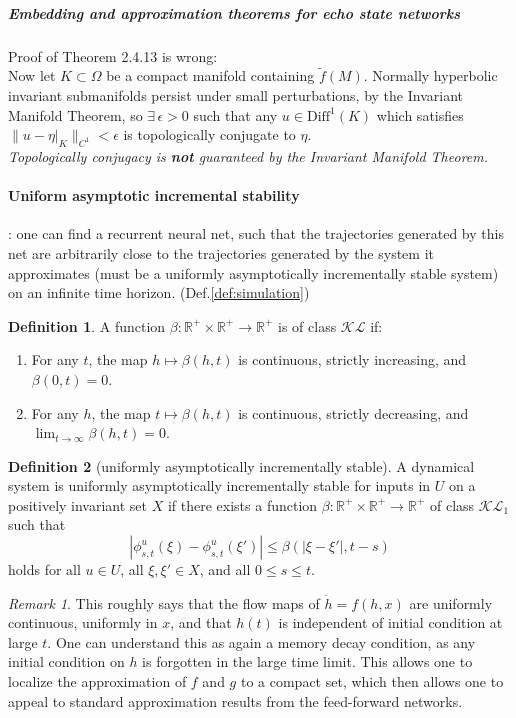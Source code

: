 \documentclass{article}
\theoremstyle{definition}
\newtheorem{definition}{Definition}
\theoremstyle{remark}
\newtheorem{remark}{Remark}
\begin{document}
\subparagraph{Embedding and approximation theorems for echo state networks}
\citep{hart2020embedding}
Proof of Theorem 2.4.13 is wrong: \\
Now let \( K \subset \Omega \) be a compact manifold containing \( \tilde{f}(M) \). Normally hyperbolic invariant submanifolds persist under small perturbations, by the Invariant Manifold Theorem, so \( \exists \, \epsilon > 0 \) such that any \( u \in \text{Diff}^1(K) \) which satisfies \( \| u - \eta|_K \|_{C^1} < \epsilon \) is topologically conjugate to \( \eta \).\\
\emph{Topologically conjugacy is \textbf{not} guaranteed by the Invariant Manifold Theorem.}




\paragraph{Uniform asymptotic incremental stability}%
\citep{hanson2020universal}: one can find a recurrent neural net, such that the trajectories generated by this net are arbitrarily close to the trajectories generated by the system it approximates (must be a uniformly asymptotically incrementally stable system) on an infinite time horizon.
(Def.\ref{def:simulation})

\citep{pavlov2006uniform}


\begin{definition}
A function \( \beta : \mathbb{R}^+ \times \mathbb{R}^+ \to \mathbb{R}^+ \) is of class \(\mathcal{KL}\) if:
\begin{enumerate}
    \item For any \( t \), the map \( h \mapsto \beta(h, t) \) is continuous, strictly increasing, and \( \beta(0, t) = 0 \).
    \item For any \( h \), the map \( t \mapsto \beta(h, t) \) is continuous, strictly decreasing, and \( \lim_{t \to \infty} \beta(h, t) = 0 \).
\end{enumerate}
\end{definition}


\begin{definition}[uniformly asymptotically incrementally stable]   
A dynamical system is uniformly asymptotically incrementally stable for inputs in $U$ on a positively invariant set $X$ if there exists a function $\beta : \mathbb{R}^+ \times \mathbb{R}^+ \to \mathbb{R}^+$ of class $\mathcal{KL}_1$ such that 
\[
|\phi^u_{s,t}(\xi) - \phi^u_{s,t}(\xi')| \leq \beta(|\xi - \xi'|, t - s)
\]
holds for all $u \in U$, all $\xi, \xi' \in X$, and all $0 \leq s \leq t$.
\end{definition}
\begin{remark}
This roughly says that the flow maps of $\dot h=f(h,x)$ are uniformly continuous, uniformly in $x$, and that $h(t)$ is independent of initial condition at large $t$.
One can understand this as again a memory decay condition, as any initial condition on $h$ is forgotten in the large time limit.
This allows one to localize the approximation of $f$ and $g$ to a compact set, which then allows one to appeal to standard approximation results from the feed-forward networks.
\end{remark}
\end{document}
